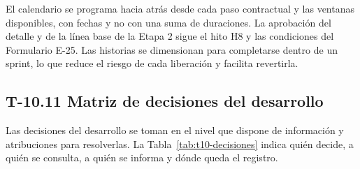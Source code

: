 \documentclass[11pt]{article}
\begin{document}
El calendario se programa hacia atrás desde cada paso contractual y las ventanas disponibles, con fechas y no con una suma de duraciones. La aprobación del detalle y de la línea base de la Etapa 2 sigue el hito H8 y las condiciones del Formulario E-25. Las historias se dimensionan para completarse dentro de un sprint, lo que reduce el riesgo de cada liberación y facilita revertirla.

\subsection{T-10.11 Matriz de decisiones del desarrollo}\label{t10-11}

Las decisiones del desarrollo se toman en el nivel que dispone de información y atribuciones para resolverlas. La Tabla~\mbox{\ref{tab:t10-decisiones}} indica quién decide, a quién se consulta, a quién se informa y dónde queda el registro.
\end{document}
